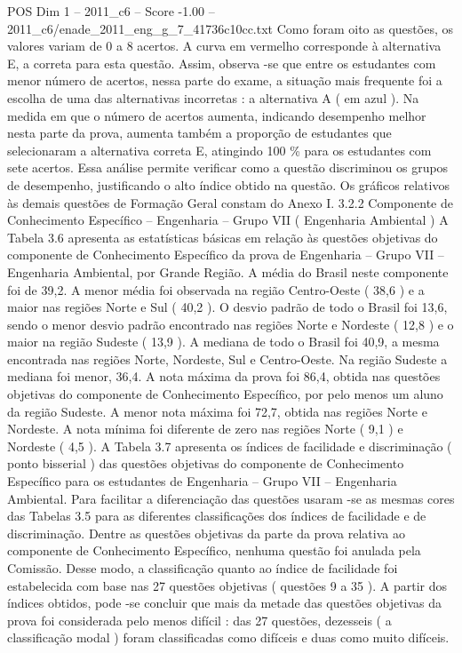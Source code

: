 \begin{textsample}{POS Dim 1 – 2011\_c6 – Score -1.00 – 2011\_c6/enade\_2011\_eng\_g\_7\_41736c10cc.txt}
Como foram oito as questões, os valores variam de 0 a 8 acertos.
A curva em vermelho corresponde à alternativa E, a correta para esta questão.
Assim, observa -se que entre os estudantes com menor número de acertos, nessa parte do exame, a situação mais frequente foi a escolha de uma das alternativas incorretas : a alternativa A ( em azul ).
Na medida em que o número de acertos aumenta, indicando desempenho melhor nesta parte da prova, aumenta também a proporção de estudantes que selecionaram a alternativa correta E, atingindo 100 \% para os estudantes com sete acertos.
Essa análise permite verificar como a questão discriminou os grupos de desempenho, justificando o alto índice obtido na questão.
Os gráficos relativos às demais questões de Formação Geral constam do Anexo I. 3.2.2 Componente de Conhecimento Específico – Engenharia – Grupo VII ( Engenharia Ambiental ) A Tabela 3.6 apresenta as estatísticas básicas em relação às questões objetivas do componente de Conhecimento Específico da prova de Engenharia – Grupo VII – Engenharia Ambiental, por Grande Região.
A média do Brasil neste componente foi de 39,2.
A menor média foi observada na região Centro-Oeste ( 38,6 ) e a maior nas regiões Norte e Sul ( 40,2 ).
O desvio padrão de todo o Brasil foi 13,6, sendo o menor desvio padrão encontrado nas regiões Norte e Nordeste ( 12,8 ) e o maior na região Sudeste ( 13,9 ).
A mediana de todo o Brasil foi 40,9, a mesma encontrada nas regiões Norte, Nordeste, Sul e Centro-Oeste.
Na região Sudeste a mediana foi menor, 36,4.
A nota máxima da prova foi 86,4, obtida nas questões objetivas do componente de Conhecimento Específico, por pelo menos um aluno da região Sudeste.
A menor nota máxima foi 72,7, obtida nas regiões Norte e Nordeste.
A nota mínima foi diferente de zero nas regiões Norte ( 9,1 ) e Nordeste ( 4,5 ).
A Tabela 3.7 apresenta os índices de facilidade e discriminação ( ponto bisserial ) das questões objetivas do componente de Conhecimento Específico para os estudantes de Engenharia – Grupo VII – Engenharia Ambiental.
Para facilitar a diferenciação das questões usaram -se as mesmas cores das Tabelas 3.5 para as diferentes classificações dos índices de facilidade e de discriminação.
Dentre as questões objetivas da parte da prova relativa ao componente de Conhecimento Específico, nenhuma questão foi anulada pela Comissão.
Desse modo, a classificação quanto ao índice de facilidade foi estabelecida com base nas 27 questões objetivas ( questões 9 a 35 ).
A partir dos índices obtidos, pode -se concluir que mais da metade das questões objetivas da prova foi considerada pelo menos difícil : das 27 questões, dezesseis ( a classificação modal ) foram classificadas como difíceis e duas como muito difíceis.

\end{textsample}
